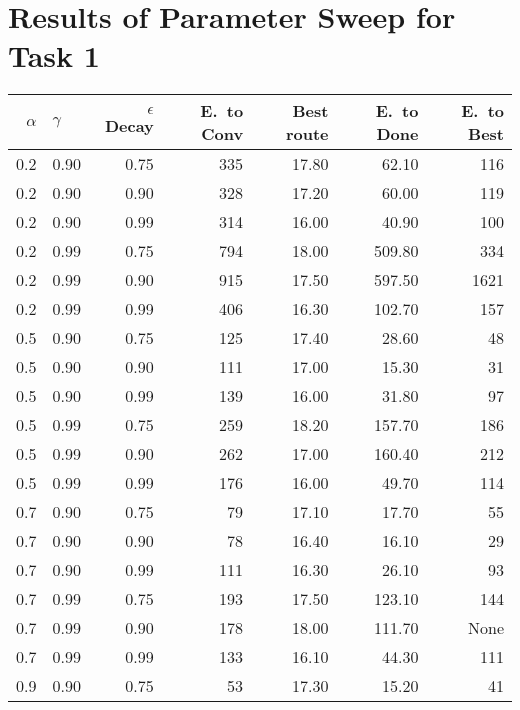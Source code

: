 \renewcommand{\topfraction}{1}
\renewcommand{\bottomfraction}{1}
\renewcommand{\textfraction}{0}
\renewcommand{\floatpagefraction}{1}

\renewcommand{\thesection}{Appendix A}
\section{Results of Parameter Sweep for Task 1}
\label{param_sweep_result_appendix}

\begin{table}[h]
	\scriptsize
	\centering
	\begin{tabular}{r l r | r r r r}
		\toprule
		$\alpha$ & $\gamma$ & $\epsilon$ Decay &
		E.\ to Conv & Best route & E.\ to Done & E.\ to Best\footnotemark[0]{} \\
		\midrule
		0.2  & 0.90  & 0.75 & 335 & 17.80 & 62.10  & 116 \\
		0.2  & 0.90  & 0.90 & 328 & 17.20 & 60.00  & 119 \\
		0.2  & 0.90  & 0.99 & 314 & 16.00 & 40.90  & 100 \\
		0.2  & 0.99  & 0.75 & 794 & 18.00 & 509.80 & 334 \\
		0.2  & 0.99  & 0.90 & 915 & 17.50 & 597.50 & 1621 \\
		0.2  & 0.99  & 0.99 & 406 & 16.30 & 102.70 & 157 \\
		0.5  & 0.90  & 0.75 & 125 & 17.40 & 28.60  & 48 \\
		0.5  & 0.90  & 0.90 & 111 & 17.00 & 15.30  & 31 \\
		\rowcolor{YellowGreen}
		0.5  & 0.90  & 0.99 & 139 & 16.00 & 31.80  & 97 \\
		0.5  & 0.99  & 0.75 & 259 & 18.20 & 157.70 & 186 \\
		0.5  & 0.99  & 0.90 & 262 & 17.00 & 160.40 & 212 \\
		0.5  & 0.99  & 0.99 & 176 & 16.00 & 49.70  & 114 \\
		0.7  & 0.90  & 0.75 & 79  & 17.10 & 17.70  & 55 \\
		0.7  & 0.90  & 0.90 & 78  & 16.40 & 16.10  & 29 \\
		0.7  & 0.90  & 0.99 & 111 & 16.30 & 26.10  & 93 \\
		0.7  & 0.99  & 0.75 & 193 & 17.50 & 123.10 & 144 \\
		0.7  & 0.99  & 0.90 & 178 & 18.00 & 111.70 & None \\
		0.7  & 0.99  & 0.99 & 133 & 16.10 & 44.30  & 111 \\
		0.9 & 0.90  & 0.75 & 53  & 17.30 & 15.20  & 41 \\

\end{tabular}
\end{table}
